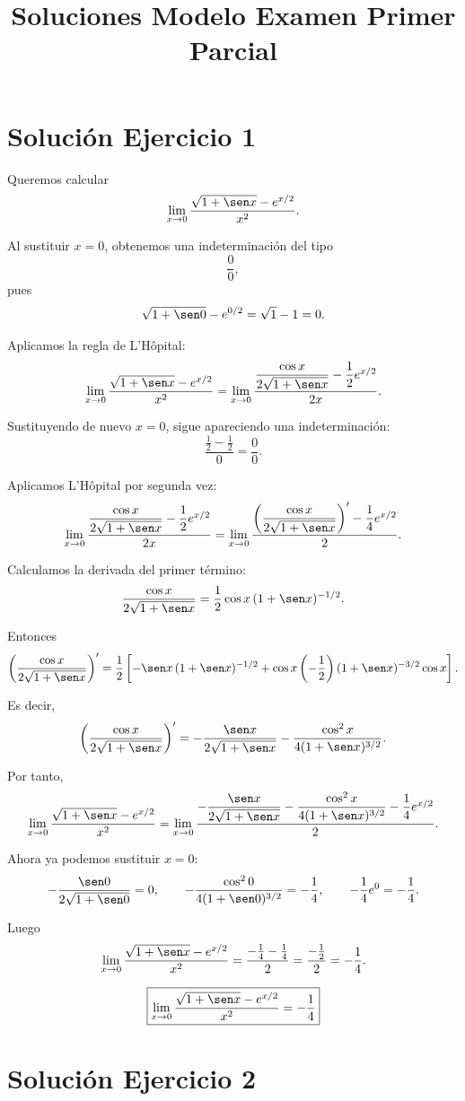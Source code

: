 \documentclass[12pt]{article}
\title{Soluciones Modelo Examen Primer Parcial}
\author{}
\date{}
\begin{document}
\maketitle

\section*{Solución Ejercicio 1}

Queremos calcular
\[
\lim_{x\to 0}\frac{\sqrt{1+\sen x}-e^{x/2}}{x^2}.
\]

Al sustituir \(x=0\), obtenemos una indeterminación del tipo
\[
\frac{0}{0},
\]
pues
\[
\sqrt{1+\sen 0}-e^{0/2}=\sqrt{1}-1=0.
\]

Aplicamos la regla de L'Hôpital:
\[
\lim_{x\to 0}\frac{\sqrt{1+\sen x}-e^{x/2}}{x^2}
=
\lim_{x\to 0}
\frac{\dfrac{\cos x}{2\sqrt{1+\sen x}}-\dfrac12 e^{x/2}}{2x}.
\]

Sustituyendo de nuevo \(x=0\), sigue apareciendo una indeterminación:
\[
\frac{\frac12-\frac12}{0}=\frac00.
\]

Aplicamos L'Hôpital por segunda vez:
\[
\lim_{x\to 0}
\frac{\dfrac{\cos x}{2\sqrt{1+\sen x}}-\dfrac12 e^{x/2}}{2x}
=
\lim_{x\to 0}
\frac{
\left(\dfrac{\cos x}{2\sqrt{1+\sen x}}\right)' - \dfrac14 e^{x/2}
}{2}.
\]

Calculamos la derivada del primer término:
\[
\frac{\cos x}{2\sqrt{1+\sen x}}
=
\frac12 \cos x \,(1+\sen x)^{-1/2}.
\]

Entonces
\[
\left(\frac{\cos x}{2\sqrt{1+\sen x}}\right)'
=
\frac12\left[
-\sen x\,(1+\sen x)^{-1/2}
+
\cos x\left(-\frac12\right)(1+\sen x)^{-3/2}\cos x
\right].
\]

Es decir,
\[
\left(\frac{\cos x}{2\sqrt{1+\sen x}}\right)'
=
-\frac{\sen x}{2\sqrt{1+\sen x}}
-\frac{\cos^2 x}{4(1+\sen x)^{3/2}}.
\]

Por tanto,
\[
\lim_{x\to 0}\frac{\sqrt{1+\sen x}-e^{x/2}}{x^2}
=
\lim_{x\to 0}
\frac{
-\dfrac{\sen x}{2\sqrt{1+\sen x}}
-\dfrac{\cos^2 x}{4(1+\sen x)^{3/2}}
-\dfrac14 e^{x/2}
}{2}.
\]

Ahora ya podemos sustituir \(x=0\):
\[
-\frac{\sen 0}{2\sqrt{1+\sen 0}}=0,
\qquad
-\frac{\cos^2 0}{4(1+\sen 0)^{3/2}}=-\frac14,
\qquad
-\frac14 e^{0}=-\frac14.
\]

Luego
\[
\lim_{x\to 0}\frac{\sqrt{1+\sen x}-e^{x/2}}{x^2}
=
\frac{-\frac14-\frac14}{2}
=
\frac{-\frac12}{2}
=
-\frac14.
\]

\[
\boxed{
\lim_{x\to 0}\frac{\sqrt{1+\sen x}-e^{x/2}}{x^2}
=
-\frac14
}
\]

\section*{Solución Ejercicio 2}
\end{document}
